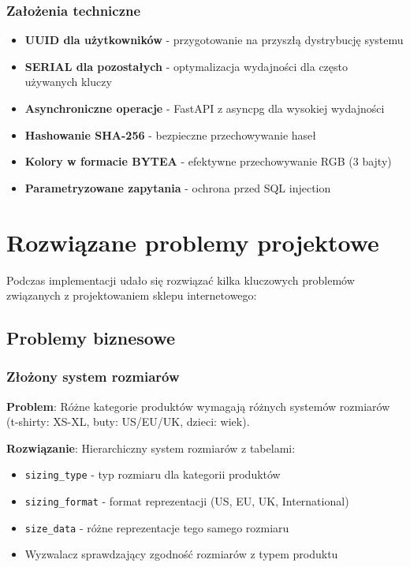 \subsubsection*{Założenia techniczne}
\begin{itemize}
    \item \textbf{UUID dla użytkowników} - przygotowanie na przyszłą dystrybucję systemu
    \item \textbf{SERIAL dla pozostałych} - optymalizacja wydajności dla często używanych kluczy
    \item \textbf{Asynchroniczne operacje} - FastAPI z asyncpg dla wysokiej wydajności
    \item \textbf{Hashowanie SHA-256} - bezpieczne przechowywanie haseł
    \item \textbf{Kolory w formacie BYTEA} - efektywne przechowywanie RGB (3 bajty)
    \item \textbf{Parametryzowane zapytania} - ochrona przed SQL injection
\end{itemize}

\section*{Rozwiązane problemy projektowe}

Podczas implementacji udało się rozwiązać kilka kluczowych problemów związanych z projektowaniem sklepu internetowego:

\subsection*{Problemy biznesowe}

\subsubsection*{Złożony system rozmiarów}
\textbf{Problem}: Różne kategorie produktów wymagają różnych systemów rozmiarów (t-shirty: XS-XL, buty: US/EU/UK, dzieci: wiek).

\textbf{Rozwiązanie}: Hierarchiczny system rozmiarów z tabelami:
\begin{itemize}
    \item \texttt{sizing\_type} - typ rozmiaru dla kategorii produktów
    \item \texttt{sizing\_format} - format reprezentacji (US, EU, UK, International)
    \item \texttt{size\_data} - różne reprezentacje tego samego rozmiaru
    \item Wyzwalacz sprawdzający zgodność rozmiarów z typem produktu
\end{itemize}

